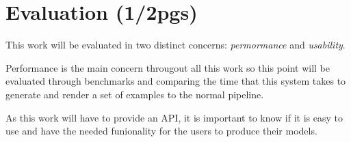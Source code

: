 
% 
% 

\section{Evaluation (1/2pgs)}
\label{sec:evaluation}


This work will be evaluated in two distinct concerns: \emph{permormance} and \emph{usability}.

Performance is the main concern througout all this work so this point will be evaluated through benchmarks and comparing the time that this system takes to generate and render a set of examples to the normal pipeline.

As this work will have to provide an API, it is important to know if it is easy to use and have the needed funionality for the users to produce their models.



